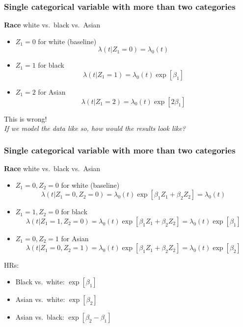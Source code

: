 \documentclass[11pt, aspectratio = 169]{beamer}
\begin{document}
\begin{frame}
  \frametitle{Single categorical variable with more than two categories}
  \textbf{Race} white vs.\ black vs.\ Asian
  \begin{itemize}
    \item $Z_1 = 0$ for white (baseline)
    \begin{equation*}
      \lambda(t|Z_1 = 0) = \lambda_0(t)
    \end{equation*}
    \item $Z_1 = 1$ for black
    \begin{equation*}
      \lambda(t|Z_1 = 1) = \lambda_0(t)\exp\left[\beta_1\right]
    \end{equation*}
    \item $Z_1 = 2$ for Asian
    \begin{equation*}
      \lambda(t|Z_1 = 2) = \lambda_0(t)\exp\left[2\beta_1\right]
    \end{equation*}
  \end{itemize}
  \alert{This is wrong!} \\
  \textit{If we model the data like so, how would the results look like?} 
\end{frame}

\begin{frame}
  \frametitle{Single categorical variable with more than two categories}
  \textbf{Race} white vs.\ black vs.\ Asian
  \begin{itemize}
    \item $Z_1 = 0, Z_2 = 0$ for white (baseline)
    \begin{equation*}
      \lambda(t|Z_1 = 0, Z_2 = 0) = \lambda_0(t)\exp\left[\beta_1Z_1 + \beta_2Z_2\right] = \lambda_0(t)
    \end{equation*}
    \item $Z_1 = 1, Z_2 = 0$ for black
    \begin{equation*}
      \lambda(t|Z_1 = 1, Z_2 = 0) = \lambda_0(t)\exp\left[\beta_1Z_1 + \beta_2Z_2\right] = \lambda_0(t)\exp\left[\beta_1\right]
    \end{equation*}
    \item $Z_1 = 0, Z_2 = 1$ for Asian
    \begin{equation*}
      \lambda(t|Z_1 = 0, Z_2 = 1) = \lambda_0(t)\exp\left[\beta_1Z_1 + \beta_2Z_2\right] = \lambda_0(t)\exp\left[\beta_2\right]
    \end{equation*}
  \end{itemize}
  HRs:
  \begin{itemize}
    \item Black vs.\ white: $\exp\left[\beta_1\right]$
    \item Asian vs.\ white: $\exp\left[\beta_2\right]$
    \item Asian vs.\ black: $\exp\left[\beta_2 - \beta_1\right]$
  \end{itemize}
\end{frame}
\end{document}

